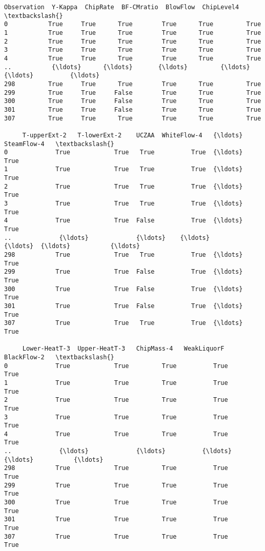 \documentclass[11pt]{article}
\makeatletter
\newcommand{\boxspacing}{\kern\kvtcb@left@rule\kern\kvtcb@boxsep}
\newcommand{\prompt}[4]{
        {\ttfamily\llap{{\color{#2}[#3]:\hspace{3pt}#4}}\vspace{-\baselineskip}}
    }
\makeatother
\begin{document}
            \begin{tcolorbox}[breakable, size=fbox, boxrule=.5pt, pad at break*=1mm, opacityfill=0]
\prompt{Out}{outcolor}{10}{\boxspacing}
\begin{Verbatim}[commandchars=\\\{\}]
     Observation  Y-Kappa  ChipRate  BF-CMratio  BlowFlow  ChipLevel4   \textbackslash{}
0           True     True      True        True      True         True
1           True     True      True        True      True         True
2           True     True      True        True      True         True
3           True     True      True        True      True         True
4           True     True      True        True      True         True
..           {\ldots}      {\ldots}       {\ldots}         {\ldots}       {\ldots}          {\ldots}
298         True     True      True        True      True         True
299         True     True     False        True      True         True
300         True     True     False        True      True         True
301         True     True     False        True      True         True
307         True     True      True        True      True         True

     T-upperExt-2   T-lowerExt-2    UCZAA  WhiteFlow-4   {\ldots}  SteamFlow-4   \textbackslash{}
0             True            True   True          True  {\ldots}          True
1             True            True   True          True  {\ldots}          True
2             True            True   True          True  {\ldots}          True
3             True            True   True          True  {\ldots}          True
4             True            True  False          True  {\ldots}          True
..             {\ldots}             {\ldots}    {\ldots}           {\ldots}  {\ldots}           {\ldots}
298           True            True   True          True  {\ldots}          True
299           True            True  False          True  {\ldots}          True
300           True            True  False          True  {\ldots}          True
301           True            True  False          True  {\ldots}          True
307           True            True   True          True  {\ldots}          True

     Lower-HeatT-3  Upper-HeatT-3   ChipMass-4   WeakLiquorF   BlackFlow-2   \textbackslash{}
0             True            True         True          True          True
1             True            True         True          True          True
2             True            True         True          True          True
3             True            True         True          True          True
4             True            True         True          True          True
..             {\ldots}             {\ldots}          {\ldots}           {\ldots}           {\ldots}
298           True            True         True          True          True
299           True            True         True          True          True
300           True            True         True          True          True
301           True            True         True          True          True
307           True            True         True          True          True


\end{Verbatim}
\end{tcolorbox}
\end{document}
